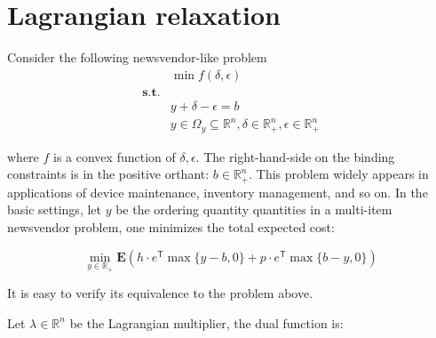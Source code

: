

\usepackage{svg}

%
%
\author{Chuwen}
\date{\today}


\title{}





{
\setcounter{tocdepth}{3}
\tableofcontents
}
\hypertarget{lagrangian-relaxation}{%
  \section{Lagrangian relaxation}\label{lagrangian-relaxation}}

Consider the following newsvendor-like problem
\begin{equation}\label{eq:primal}
  \begin{aligned}
                  & \min f(\delta, \epsilon)                                                                       \\
    \mathbf{s.t.} &                                                                                                \\
                  & y + \delta - \epsilon = b                                                                      \\
                  & y \in \Omega_y \subseteq \mathbb{R}^n, \delta \in \mathbb{R}^n_+ , \epsilon \in \mathbb{R}^n_+
  \end{aligned}
\end{equation}

where \(f\) is a convex function of \(\delta, \epsilon\). The
right-hand-side on the binding constraints is in the positive orthant:
\(b \in \mathbb R_+^n.\) This problem widely appears in applications of
device maintenance, inventory management, and so on. In the basic
settings, let \(y\) be the ordering quantity quantities in a multi-item
newsvendor problem, one minimizes the total expected cost:

\[\min_{y \in \mathbb R_+} \mathbf E\left(h\cdot e^\mathsf{T} \max\{y - b,  0\} + p \cdot e^\mathsf{T} \max\{b - y,  0\}\right)\]

It is easy to verify its equivalence to the problem above.

Let \(\lambda\in\mathbb{R}^n\) be the Lagrangian multiplier, the dual
function is:

